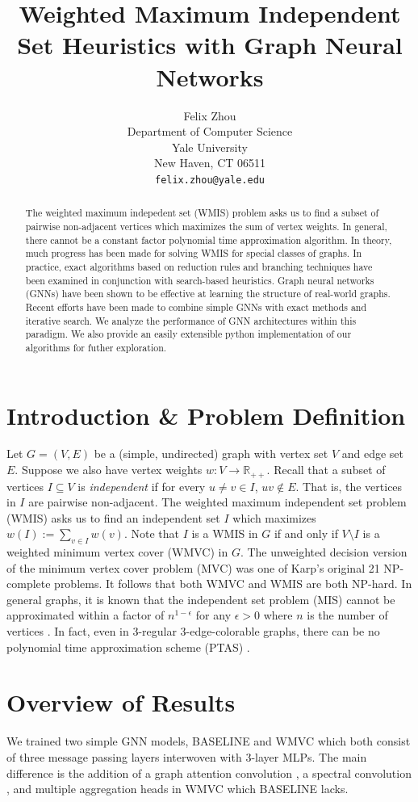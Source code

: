 \documentclass{article}
\title{Weighted Maximum Independent Set Heuristics with Graph Neural Networks}
\author{%
  Felix Zhou\\
  Department of Computer Science\\
  Yale University\\
  New Haven, CT 06511 \\
  \texttt{felix.zhou@yale.edu} \\
}
\newcommand{\R}{\mathbb{R}}
\newcommand{\sset}{\subseteq}
\begin{document}
\maketitle


\begin{abstract}
  The weighted maximum indepedent set (WMIS) problem asks us to find a subset of pairwise non-adjacent vertices
  which maximizes the sum of vertex weights.
  In general, there cannot be a constant factor polynomial time approximation algorithm.
  In theory, much progress has been made for solving WMIS for special classes of graphs.
  In practice, exact algorithms based on reduction rules and branching techniques have been examined
  in conjunction with search-based heuristics.
  Graph neural networks (GNNs) have been shown to be effective at learning the structure of real-world graphs.
  Recent efforts have been made to combine simple GNNs with exact methods and iterative search.
  We analyze the performance of GNN architectures within this paradigm.
  We also provide an easily extensible python implementation of our algorithms for futher exploration.
\end{abstract}


\section{Introduction \& Problem Definition}
Let $G=(V, E)$ be a (simple, undirected) graph with vertex set $V$
and edge set $E$.
Suppose we also have vertex weights $w: V\to \R_{++}$.
Recall that a subset of vertices $I\sset V$ is \emph{independent}
if for every $u\neq v\in I$, $uv\notin E$.
That is, the vertices in $I$ are pairwise non-adjacent.
The weighted maximum independent set problem (WMIS)
asks us to find an independent set $I$ which maximizes $w(I) := \sum_{v\in I} w(v)$.
Note that $I$ is a WMIS in $G$
if and only if $V\setminus I$ is a weighted minimum vertex cover (WMVC) in $G$.
The unweighted decision version of the minimum vertex cover problem (MVC)
was one of Karp's original 21 NP-complete problems.
It follows that both WMVC and WMIS are both NP-hard.
In general graphs,
it is known that the independent set problem (MIS) cannot be approximated within a factor of $n^{1-\epsilon}$ for any $\epsilon > 0$ where $n$ is the number of vertices \citet{zuckerman2006linear}.
In fact, even in 3-regular 3-edge-colorable graphs,
there can be no polynomial time approximation scheme (PTAS) \citet{berman1999appr}.

\section{Overview of Results}
We trained two simple GNN models,
BASELINE and WMVC which both consist of three message passing layers
interwoven with 3-layer MLPs.
The main difference is the addition of a graph attention convolution \citet{brody2021attentive},
a spectral convolution \citet{defferrard2016conv},
and multiple aggregation heads \citet{corso2020principal, tailor2021we} in WMVC which BASELINE lacks.
\end{document}
